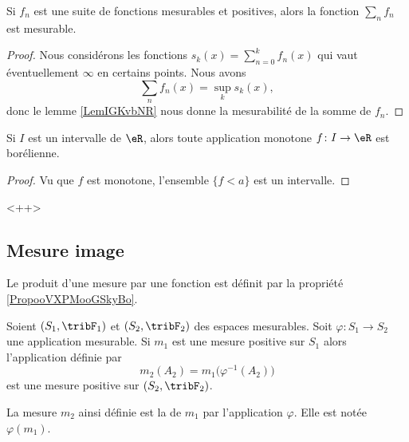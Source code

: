 \begin{proposition}\label{PropFYPEOIJ}
    Si \( f_n\) est une suite de fonctions mesurables et positives, alors la fonction \( \sum_nf_n\) est mesurable.
\end{proposition}

\begin{proof}
    Nous considérons les fonctions \( s_k(x)=\sum_{n=0}^kf_n(x)\) qui vaut éventuellement \( \infty\) en certains points. Nous avons
    \begin{equation}
        \sum_nf_n(x)=\sup_ks_k(x),
    \end{equation}
    donc le lemme \ref{LemIGKvbNR} nous donne la mesurabilité de la somme de \( f_n\).
\end{proof}

\begin{corollary}
    Si \( I\) est un intervalle de \( \eR\), alors toute application monotone \( f\colon I\to \eR\) est borélienne.
\end{corollary}

\begin{proof}
    Vu que \( f\) est monotone, l'ensemble \( \{ f<a \}\) est un intervalle.
\end{proof}
<++>

\subsection{Mesure image}

Le produit d'une mesure par une fonction est définit par la propriété \ref{PropooVXPMooGSkyBo}.

\begin{propositionDef}     \label{PropJCJQooAdqrGA}
    Soient \( (S_1,\tribF_1)\) et \( (S_2,\tribF_2)\) des espaces mesurables. Soit \( \varphi\colon S_1\to S_2\) une application mesurable. Si \( m_1\) est une mesure positive sur \( S_1\) alors l'application définie par
    \begin{equation}
        m_2(A_2)=m_1\big( \varphi^{-1}(A_2) \big)
    \end{equation}
    est une mesure positive sur \( (S_2,\tribF_2)\).

    La mesure \( m_2\) ainsi définie est la  de \( m_1\) par l'application \( \varphi\). Elle est notée \( \varphi(m_1)\).
\end{propositionDef}

